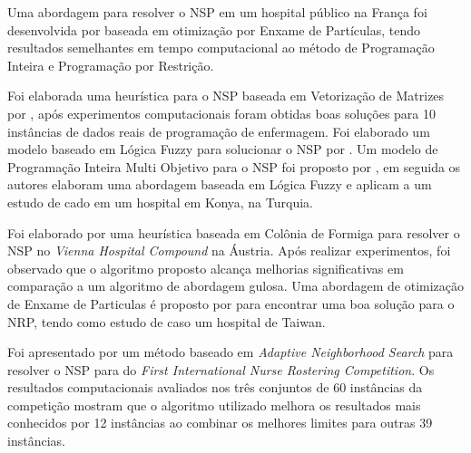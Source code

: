 Uma abordagem para resolver o \ac{NSP} em um hospital público na França foi desenvolvida por \cite{altamirano:2010} baseada em otimização por Enxame de Partículas, tendo resultados semelhantes em tempo computacional ao método de Programação Inteira e Programação por Restrição.

Foi elaborada uma heurística para o \ac{NSP} baseada em Vetorização de Matrizes por \cite{yindong:2008}, após experimentos computacionais foram obtidas boas soluções para 10 instâncias de dados reais de programação de enfermagem. 
Foi elaborado um modelo baseado em Lógica Fuzzy para solucionar o \ac{NSP} por \cite{topaloglu:2010}.
Um modelo de Programação Inteira Multi Objetivo para o \ac{NSP} foi proposto por \cite{cetin:2015}, em seguida os autores elaboram uma abordagem baseada em Lógica Fuzzy e aplicam a um estudo de cado em um hospital em Konya, na Turquia.

Foi elaborado por \cite{gutjahra:2007} uma heurística baseada em Colônia de Formiga para resolver o \ac{NSP} no \textit{Vienna Hospital Compound} na Áustria. Após realizar experimentos, foi observado que o algoritmo proposto alcança melhorias significativas em comparação a um algoritmo de abordagem gulosa.
Uma abordagem de otimização de Enxame de Particulas é proposto por \cite{wu:2015} para encontrar uma boa solução para o \ac{NRP}, tendo como estudo de caso um hospital de Taiwan. 


Foi apresentado por \cite{lu:2012} um método baseado em \textit{Adaptive Neighborhood Search} para resolver o \ac{NSP} para do \textit{ First International Nurse Rostering Competition}.  Os resultados computacionais avaliados nos três conjuntos de 60 instâncias da competição mostram que o algoritmo utilizado melhora os resultados mais conhecidos por 12 instâncias ao combinar os melhores limites para outras 39 instâncias.


